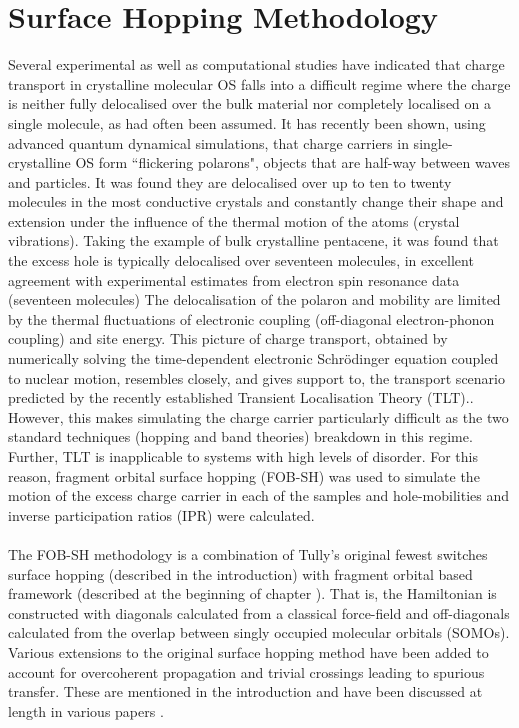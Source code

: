 \section{Surface Hopping Methodology}
Several experimental as well as computational studies have indicated that charge transport in crystalline molecular OS falls into a difficult regime where the charge is neither fully delocalised over the bulk material nor completely localised on a single molecule, as had often been assumed.\cite{Vehoff2010,Deng2004,Kwiatkowski2009,Athanasopoulos2007,Vehoff2010_2,Kordt2016,Zhang2019} It has recently been shown, using advanced quantum dynamical simulations, that charge carriers in single-crystalline OS form ``flickering polarons", objects that are half-way between waves and particles\cite{FlickPolarons,Giannini2019,Ziogos20}. It was found they are delocalised over up to ten to twenty molecules in the most conductive crystals and constantly change their shape and extension under the influence of the thermal motion of the atoms (crystal vibrations).  Taking the example of bulk crystalline pentacene, it was found that the excess hole is typically delocalised over seventeen molecules, in excellent agreement with experimental estimates from electron spin resonance data (seventeen molecules) The delocalisation of the polaron and mobility are limited by the thermal fluctuations of electronic coupling (off-diagonal electron-phonon coupling) and site energy. This picture of charge transport, obtained by numerically solving the time-dependent electronic Schr\"odinger equation coupled to nuclear motion, resembles closely, and gives support to, the transport scenario predicted by the recently established Transient Localisation Theory (TLT).\cite{Nematiaram2019,PhysRevB.83.081202}. However, this makes simulating the charge carrier particularly difficult as the two standard techniques (hopping and band theories) breakdown in this regime. Further, TLT is inapplicable to systems with high levels of disorder. For this reason, fragment orbital surface hopping (FOB-SH) was used to simulate the motion of the excess charge carrier in each of the samples and hole-mobilities and inverse participation ratios (IPR) were calculated.
\\\\
The FOB-SH methodology is a combination of Tully's original fewest switches surface hopping (described in the introduction) with fragment orbital based framework (described at the beginning of chapter \label{chap:molecular_systems}). That is, the Hamiltonian is constructed with diagonals calculated from a classical force-field and off-diagonals calculated from the overlap between singly occupied molecular orbitals (SOMOs). Various extensions to the original surface hopping method have been added to account for overcoherent propagation and trivial crossings leading to spurious transfer. These are mentioned in the introduction and have been discussed at length in various papers \cite{Giannini2018Crossover,Carof2017FSSH,C9FD00046A,C9CP04770K,C9TC05270D,FlickPolarons,FOB-SH_Spencer}.

